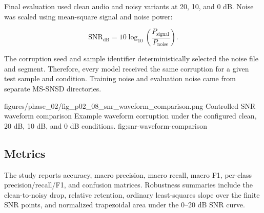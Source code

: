 Final evaluation used clean audio and noisy variants at 20, 10, and 0 dB. Noise
was scaled using mean-square signal and noise power:

\begin{equation}
  \mathrm{SNR}_{\mathrm{dB}}
  = 10 \log_{10}\left(\frac{P_{\mathrm{signal}}}{P_{\mathrm{noise}}}\right).
\end{equation}

The corruption seed and sample identifier deterministically selected the noise
file and segment. Therefore, every model received the same corruption for a
given test sample and condition. Training noise and evaluation noise came from
separate MS-SNSD directories.

\ProjectFigure
  {figures/phase_02/fig_p02_08_snr_waveform_comparison.png}
  {\columnwidth}
  {Controlled SNR waveform comparison}
  {Example waveform corruption under the configured clean, 20 dB, 10 dB, and
  0 dB conditions.}
  {fig:snr-waveform-comparison}

\subsection{Metrics}

The study reports accuracy, macro precision, macro recall, macro F1, per-class
precision/recall/F1, and confusion matrices. Robustness summaries include the
clean-to-noisy drop, relative retention, ordinary least-squares slope over the
finite SNR points, and normalized trapezoidal area under the 0--20 dB SNR curve.
